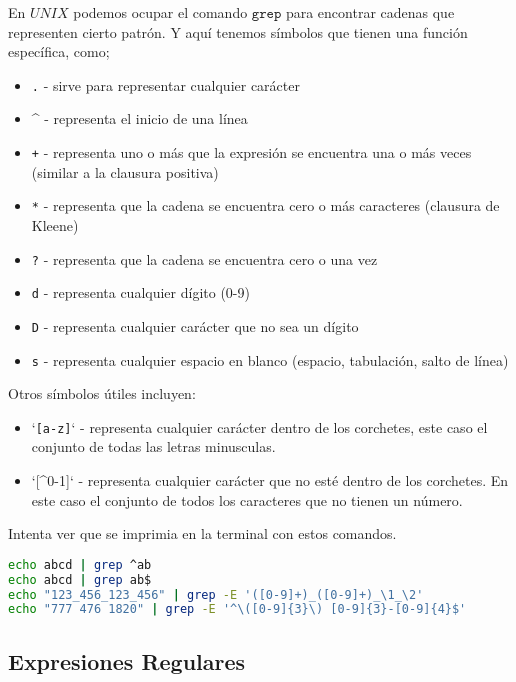 En $UNIX$ podemos ocupar el comando $\texttt{grep}$ para encontrar cadenas que representen cierto patrón. Y aquí tenemos 
símbolos que tienen una función específica, como;

\begin{itemize}
    \item \texttt{.} - sirve para representar cualquier carácter
    \item \^{} - representa el inicio de una línea
    \item \texttt{+} - representa uno o más que la expresión se encuentra una o más veces (similar a la clausura positiva)
    \item \texttt{*} - representa que la cadena se encuentra cero o más caracteres (clausura de Kleene)
    \item \texttt{?} - representa que la cadena se encuentra cero o una vez
    \item \texttt{d} - representa cualquier dígito (0-9)
    \item \texttt{D} - representa cualquier carácter que no sea un dígito
    \item \texttt{s} - representa cualquier espacio en blanco (espacio, tabulación, salto de línea)
\end{itemize}

Otros símbolos útiles incluyen:

\begin{itemize}
    \item `\texttt{[a-z]}` - representa cualquier carácter dentro de los corchetes, este caso el conjunto de todas las letras minusculas. 
    \item `[\^{}0-1]` - representa cualquier carácter que no esté dentro de los corchetes. En este caso el conjunto de todos los caracteres que no tienen un número. 
\end{itemize}

Intenta ver que se imprimia en la terminal con estos comandos. 

\begin{lstlisting}[language=bash]
echo abcd | grep ^ab
echo abcd | grep ab$
echo "123_456_123_456" | grep -E '([0-9]+)_([0-9]+)_\1_\2'
echo "777 476 1820" | grep -E '^\([0-9]{3}\) [0-9]{3}-[0-9]{4}$'
\end{lstlisting}

\subsection{Expresiones Regulares}

